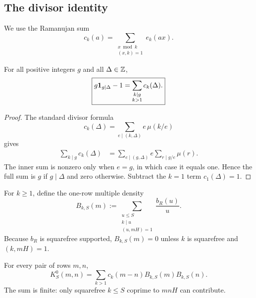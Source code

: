 \subsection{The divisor identity}

We use the Ramanujan sum
\begin{equation}
 c_k(a)=\sum_{\substack{x\bmod k\\(x,k)=1}}e_k(ax).
 \label{eq:tpc27-Ramanujan-sum}
\end{equation}

\begin{lemma}
\label{lem:tpc27-Ramanujan-resolution}
For all positive integers \(g\) and all \(\Delta\in\mathbb Z\),
\begin{equation}
 \boxed{
 g\mathbf 1_{g\mid\Delta}-1
 =\sum_{\substack{k\mid g\\k>1}}c_k(\Delta).}
 \label{eq:tpc27-Ramanujan-resolution}
\end{equation}
\end{lemma}

\begin{proof}
The standard divisor formula
\begin{equation}
 c_k(\Delta)=
 \sum_{e\mid(k,\Delta)}e\,\mu(k/e)
 \label{eq:tpc27-c-divisor-formula}
\end{equation}
gives
\begin{align*}
 \sum_{k\mid g}c_k(\Delta)
 &=\sum_{e\mid(g,\Delta)}e
   \sum_{r\mid g/e}\mu(r).
\end{align*}
The inner sum is nonzero only when \(e=g\), in which case it equals
one.  Hence the full sum is \(g\) if \(g\mid\Delta\) and zero
otherwise.  Subtract the \(k=1\) term \(c_1(\Delta)=1\).
\end{proof}

For \(k\ge1\), define the one-row multiple density
\begin{equation}
 B_{k,S}(m)
 :=\sum_{\substack{u\le S\\k\mid u\\(u,mH)=1}}
 \frac{b_R(u)}u.
 \label{eq:tpc27-Bks}
\end{equation}
Because \(b_R\) is squarefree supported, \(B_{k,S}(m)=0\) unless
\(k\) is squarefree and \((k,mH)=1\).

\begin{theorem}
\label{thm:tpc27-Ramanujan-square}
For every pair of rows \(m,n\),
\begin{equation}
 \boxed{
 K_S^0(m,n)=
 \sum_{k>1}c_k(m-n)B_{k,S}(m)B_{k,S}(n).}
 \label{eq:tpc27-Ramanujan-square}
\end{equation}
The sum is finite: only squarefree \(k\le S\) coprime to \(mnH\)
can contribute.
\end{theorem}

